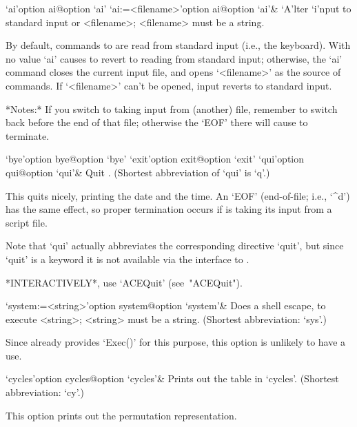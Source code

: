 \enditems


\beginitems

\>`ai'{option ai}@{option `ai'}
\>`ai:=<filename>'{option ai}@{option `ai'}&
`A'lter `i'nput to standard input or <filename>; <filename> must be  a
string.

By default, commands to {\ACE} are read from standard input (i.e., the
keyboard). With no value `ai' causes {\ACE} to revert to reading  from
standard input; otherwise, the `ai' command closes the  current  input
file,  and  opens  `<filename>'  as  the  source   of   commands.   If
`<filename>' can't be opened, input reverts to standard input.

*Notes:*
If you switch to taking input from (another) file, remember to  switch
back before the end of that file; otherwise the `EOF' there will cause
{\ACE} to terminate.

\>`bye'{option bye}@{option `bye'}
\>`exit'{option exit}@{option `exit'}
\>`qui'{option qui}@{option `qui'}&
Quit {\ACE}. (Shortest abbreviation of `qui' is `q'.)

This quits {\ACE} nicely, printing the date and  the  time.  An  `EOF'
(end-of-file;  i.e.,  `\^{}d')  has  the  same   effect,   so   proper
termination occurs if {\ACE} is taking its input from a script file.

Note  that  `qui'  actually  abbreviates  the   corresponding   {\ACE}
directive `quit', but since `quit' is  a  {\GAP}  keyword  it  is  not
available via the {\GAP} interface to {\ACE}.

*INTERACTIVELY*, use `ACEQuit' (see~"ACEQuit").

\>`system:=<string>'{option system}@{option `system'}&
Does a shell escape, to execute <string>; <string> must be a string.
(Shortest abbreviation: `sys'.)

Since {\GAP} already provides `Exec()' for this purpose,  this  option
is unlikely to have a use.

\enditems


\beginitems

\>`cycles'{option cycles}@{option `cycles'}&
Prints out the table in `cycles'. (Shortest abbreviation: `cy'.)

This option prints out the permutation representation.

